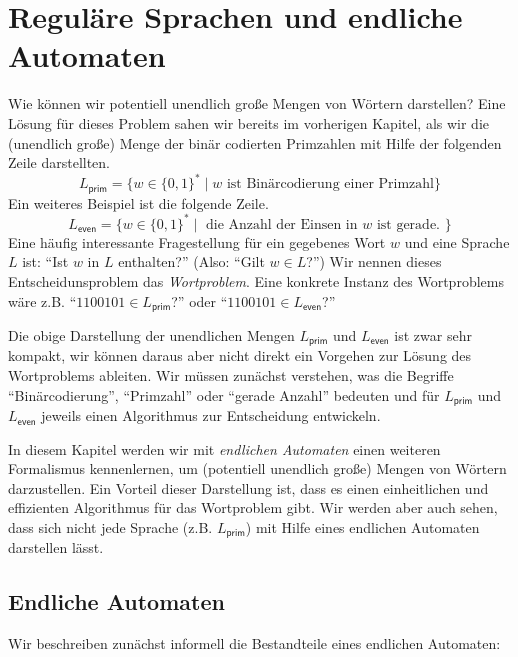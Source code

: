 \section[Reguläre Sprachen und endliche Automaten]{Reguläre Sprachen und endliche Automaten}
Wie können wir potentiell unendlich große Mengen von Wörtern darstellen?
Eine Lösung für dieses Problem sahen wir bereits im vorherigen Kapitel, als wir die (unendlich große) Menge der binär codierten Primzahlen mit Hilfe der folgenden Zeile darstellten.
\[
L_\mathsf{prim}=\{w\in\{0,1\}^*\mid w \text{ ist Binärcodierung einer Primzahl}\}
\]
Ein weiteres Beispiel ist die folgende Zeile.
\[
L_\mathsf{even}=\{w\in\{0,1\}^*\mid \text{ die Anzahl der Einsen in $w$ ist gerade. }\}
\]
Eine häufig interessante Fragestellung für ein gegebenes Wort $w$ und eine Sprache $L$ ist: "`Ist $w$ in $L$ enthalten?"' (Also: "`Gilt $w\in L$?"')
Wir nennen dieses Entscheidunsproblem das \emph{Wortproblem}. Eine konkrete Instanz des Wortproblems wäre z.B. "`$1100101\in L_\mathsf{prim}$?"' oder "`$1100101\in L_\mathsf{even}$?"'

Die obige Darstellung der unendlichen Mengen $L_\mathsf{prim}$ und $L_\mathsf{even}$ ist zwar sehr kompakt, 
wir können daraus aber nicht direkt ein Vorgehen zur Lösung des Wortproblems ableiten.
Wir müssen zunächst verstehen, was die Begriffe "`Binärcodierung"', "`Primzahl"' oder "`gerade Anzahl"' bedeuten und für $L_\mathsf{prim}$ und $L_\mathsf{even}$ jeweils einen Algorithmus zur Entscheidung entwickeln.

In diesem Kapitel werden wir mit \emph{endlichen Automaten} einen weiteren Formalismus kennenlernen, um (potentiell unendlich große) Mengen von Wörtern darzustellen. 
Ein Vorteil dieser Darstellung ist, dass es einen einheitlichen und effizienten Algorithmus für das Wortproblem gibt.
Wir werden aber auch sehen, dass sich nicht jede Sprache (z.B. $L_\mathsf{prim}$) mit Hilfe eines endlichen Automaten darstellen lässt.

\subsection{Endliche Automaten}
Wir beschreiben zunächst informell die Bestandteile eines endlichen Automaten:

\newcommand{\qinit}{{q^\mathsf{init}}}
\newcommand{\B}{\mathcal{B}}
\newcommand{\calN}{\mathcal{N}}
\newcommand{\calP}{\mathcal{P}}
\newcommand{\ecl}{\textsf{ecl}}
\newcommand{\reach}{\textsf{reach}}
\newcommand{\hide}[1]{}

